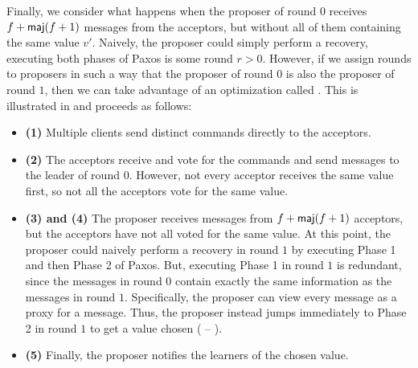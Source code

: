 Finally, we consider what happens when the proposer of round $0$ receives $f +
\textsf{maj}(f+1)$  messages from the acceptors, but without all of
them containing the same value $v'$. Naively, the proposer could simply
perform a recovery, executing both phases of Paxos is some round $r > 0$.
However, if we assign rounds to proposers in such a way that the proposer of
round $0$ is also the proposer of round $1$, then we can take advantage of an
optimization called . This is illustrated in
 and proceeds as follows:

\begin{itemize}
  \item \textbf{(1)}
    Multiple clients send distinct commands directly to the acceptors.

  \item \textbf{(2)}
    The acceptors receive and vote for the commands and send 
    messages to the leader of round $0$. However, not every acceptor receives
    the same value first, so not all the acceptors vote for the same value.

  \item \textbf{(3) and (4)}
    The proposer receives  messages from $f+\textsf{maj}(f+1)$
    acceptors, but the acceptors have not all voted for the same value. At this
    point, the proposer could naively perform a recovery in round $1$ by
    executing Phase 1 and then Phase 2 of Paxos. But, executing Phase 1 in
    round $1$ is redundant, since the  messages in round $0$
    contain exactly the same information as the  messages in
    round $1$. Specifically, the proposer can view every 
    message as a proxy for a  message. Thus, the proposer
    instead jumps immediately to Phase 2 in round $1$ to get a value chosen
    ( -- ).

  \item \textbf{(5)}
    Finally, the proposer notifies the learners of the chosen value.
\end{itemize}
